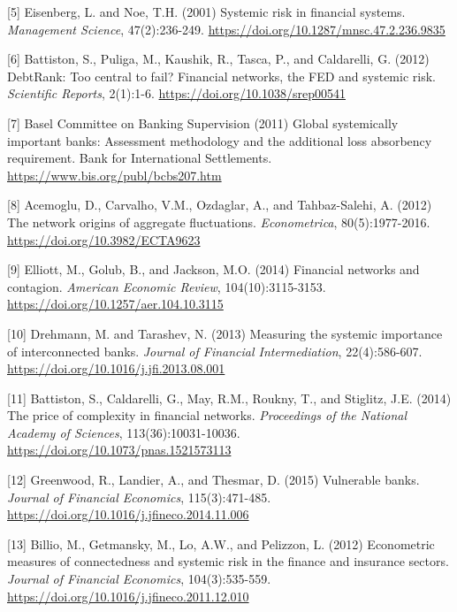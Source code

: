 \documentclass[a4 paper, 11pt,twoside]{article}
\newcommand{\0}{\Bf{0}}
\theoremstyle{definition}
\begin{document}
\label{ref5}[5] Eisenberg, L. and Noe, T.H. (2001) Systemic risk in financial systems. \emph{Management Science}, 47(2):236-249. \href{https://doi.org/10.1287/mnsc.47.2.236.9835}{https://doi.org/10.1287/mnsc.47.2.236.9835}

\label{ref6}[6] Battiston, S., Puliga, M., Kaushik, R., Tasca, P., and Caldarelli, G. (2012) DebtRank: Too central to fail? Financial networks, the FED and systemic risk. \emph{Scientific Reports}, 2(1):1-6. \href{https://doi.org/10.1038/srep00541}{https://doi.org/10.1038/srep00541}

\label{ref7}[7] Basel Committee on Banking Supervision (2011) Global systemically important banks: Assessment methodology and the additional loss absorbency requirement. Bank for International Settlements. \href{https://www.bis.org/publ/bcbs207.htm}{https://www.bis.org/publ/bcbs207.htm}

\label{ref8}[8] Acemoglu, D., Carvalho, V.M., Ozdaglar, A., and Tahbaz-Salehi, A. (2012) The network origins of aggregate fluctuations. \emph{Econometrica}, 80(5):1977-2016. \href{https://doi.org/10.3982/ECTA9623}{https://doi.org/10.3982/ECTA9623}

\label{ref9}[9] Elliott, M., Golub, B., and Jackson, M.O. (2014) Financial networks and contagion. \emph{American Economic Review}, 104(10):3115-3153. \href{https://doi.org/10.1257/aer.104.10.3115}{https://doi.org/10.1257/aer.104.10.3115}

\label{ref10}[10] Drehmann, M. and Tarashev, N. (2013) Measuring the systemic importance of interconnected banks. \emph{Journal of Financial Intermediation}, 22(4):586-607. \href{https://doi.org/10.1016/j.jfi.2013.08.001}{https://doi.org/10.1016/j.jfi.2013.08.001}

\label{ref11}[11] Battiston, S., Caldarelli, G., May, R.M., Roukny, T., and Stiglitz, J.E. (2014) The price of complexity in financial networks. \emph{Proceedings of the National Academy of Sciences}, 113(36):10031-10036. \href{https://doi.org/10.1073/pnas.1521573113}{https://doi.org/10.1073/pnas.1521573113}

\label{ref12}[12] Greenwood, R., Landier, A., and Thesmar, D. (2015) Vulnerable banks. \emph{Journal of Financial Economics}, 115(3):471-485. \href{https://doi.org/10.1016/j.jfineco.2014.11.006}{https://doi.org/10.1016/j.jfineco.2014.11.006}

\label{ref13}[13] Billio, M., Getmansky, M., Lo, A.W., and Pelizzon, L. (2012) Econometric measures of connectedness and systemic risk in the finance and insurance sectors. \emph{Journal of Financial Economics}, 104(3):535-559. \href{https://doi.org/10.1016/j.jfineco.2011.12.010}{https://doi.org/10.1016/j.jfineco.2011.12.010}
\end{document}
